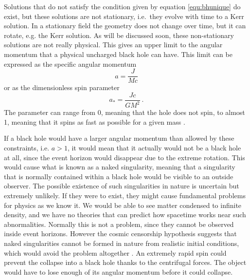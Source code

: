 \documentclass[english, oneside]{HYgradu}
\begin{document}
Solutions that do not satisfy the condition given by equation \eqref{equ:bhunique} do exist, but these solutions are not stationary, i.e.\ they evolve with time to a Kerr solution. In a stationary field the geometry does not change over time, but it can rotate, e.g. the Kerr solution. As will be discussed soon, these non-stationary solutions are not really physical. This gives an upper limit to the angular momentum that a physical uncharged black hole can have. This limit can be expressed as the specific angular momentum 
\begin{equation} \label{equ:angularmomentum}
a = \frac{J}{Mc}
\end{equation}
or as the dimensionless spin parameter
\begin{equation}
a_* = \frac{Jc}{GM^2} \ .
\end{equation}
The parameter can range from 0, meaning that the hole does not spin, to almost 1, meaning that it spins as fast as possible for a given mass \citep{middleton:2016}.

If a black hole would have a larger angular momentum than allowed by these constraints, i.e. $a > 1$, it would mean that it actually would not be a black hole at all, since the event horizon would disappear due to the extreme rotation. 
This would cause what is known as a naked singularity, meaning that a singularity that is normally contained within a black hole would be visible to an outside observer. The possible existence of such singularities in nature is uncertain but extremely unlikely. If they were to exist, they might cause fundamental problems for physics as we know it. We would be able to see matter condensed to infinite density, and we have no theories that can predict how spacetime works near such abnormalities. Normally this is not a problem, since they cannot be observed inside event horizons. However the cosmic censorship hypothesis suggests that naked singularities cannot be formed in nature from realistic initial conditions, which would avoid the problem altogether \citep{wald:1997}. An extremely rapid spin could prevent the collapse into a black hole thanks to the centrifugal forces. The object would have to lose enough of its angular momentum before it could collapse.
\end{document}
